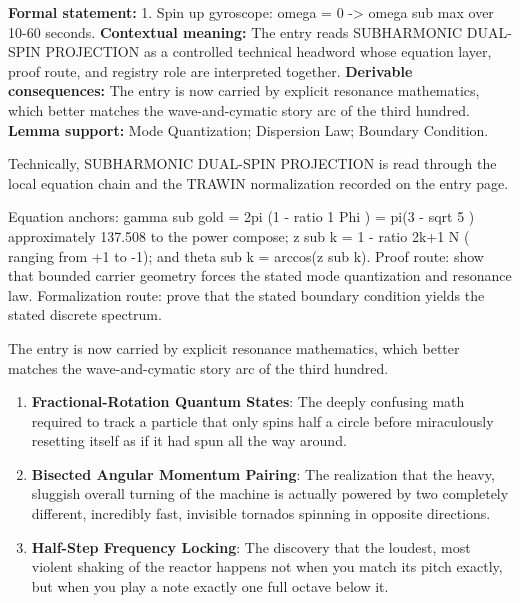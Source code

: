 \begingroup\footnotesize\setlength{\emergencystretch}{3em}\sloppy
\textbf{Formal statement:} 1. Spin up gyroscope: omega = 0 -> omega sub max over 10-60 seconds. \textbf{Contextual meaning:} The entry reads SUBHARMONIC DUAL-SPIN PROJECTION as a controlled technical headword whose equation layer, proof route, and registry role are interpreted together. \textbf{Derivable consequences:} The entry is now carried by explicit resonance mathematics, which better matches the wave-and-cymatic story arc of the third hundred. \textbf{Lemma support:} Mode Quantization; Dispersion Law; Boundary Condition.\par
\endgroup

Technically, SUBHARMONIC DUAL-SPIN PROJECTION is read through the local equation chain and the TRAWIN normalization recorded on the entry page.

Equation anchors: gamma sub gold = 2pi (1 - ratio 1 Phi ) = pi(3 - sqrt 5 ) approximately 137.508 to the power compose; z sub k = 1 - ratio 2k+1 N ( ranging from +1 to -1); and theta sub k = arccos(z sub k). Proof route: show that bounded carrier geometry forces the stated mode quantization and resonance law. Formalization route: prove that the stated boundary condition yields the stated discrete spectrum.

The entry is now carried by explicit resonance mathematics, which better matches the wave-and-cymatic story arc of the third hundred.
\endgroup

\begin{enumerate}[leftmargin=1.6em,itemsep=6pt,topsep=4pt]
\item \textbf{Fractional-Rotation Quantum States}: The deeply confusing math required to track a particle that only spins half a circle before miraculously resetting itself as if it had spun all the way around.
\item \textbf{Bisected Angular Momentum Pairing}: The realization that the heavy, sluggish overall turning of the machine is actually powered by two completely different, incredibly fast, invisible tornados spinning in opposite directions.
\item \textbf{Half-Step Frequency Locking}: The discovery that the loudest, most violent shaking of the reactor happens not when you match its pitch exactly, but when you play a note exactly one full octave below it.
\end{enumerate}

